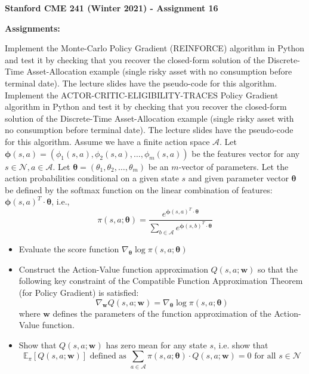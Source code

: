 \documentclass[12pt]{exam}
\begin{document}
\begin{center}
{\large {\bf Stanford CME 241 (Winter 2021) - Assignment 16}}
\end{center}
 
{\large{\bf Assignments:}}
\begin{questions}
\question Implement the Monte-Carlo Policy Gradient (REINFORCE) algorithm in Python and test it by checking that you recover the closed-form solution of the Discrete-Time Asset-Allocation example (single risky asset with no consumption before terminal date). The lecture slides have the pseudo-code for this algorithm.
\question Implement the ACTOR-CRITIC-ELIGIBILITY-TRACES Policy Gradient algorithm in Python and test it by checking that you recover the closed-form solution of the Discrete-Time Asset-Allocation example (single risky asset with no consumption before terminal date). The lecture slides have the pseudo-code for this algorithm.
\question Assume we have a finite action space $\mathcal{A}$. Let $\bm{\phi}(s,a) = (\phi_1(s,a), \phi_2(s,a), \ldots, \phi_m(s,a))$ be the features vector for any $s \in \mathcal{N}, a \in \mathcal{A}$. Let $\bm{\theta} = (\theta_1, \theta_2, \ldots, \theta_m)$ be an $m$-vector of parameters. Let the action probabilities conditional on a given state $s$ and given parameter vector $\bm{\theta}$ be defined by the softmax function on the linear combination of features: $\bm{\phi}(s,a)^T \cdot \bm{\theta}$, i.e.,
$$\pi(s, a ; \bm{\theta}) = \frac {e^{\bm{\phi}(s,a)^T \cdot \bm{\theta}}} {\sum_{b \in \mathcal{A}} e^{\bm{\phi}(s,b)^T \cdot \bm{\theta}}}$$
\begin{itemize}
\item Evaluate the score function $\nabla_{\bm{\theta}} \log \pi(s, a ; \bm{\theta})$
\item Construct the Action-Value function approximation $Q(s,a; \bm{w})$ so that the following key constraint of the Compatible Function Approximation Theorem (for Policy Gradient) is satisfied:
 $$\nabla_{\bm{w}} Q(s,a;\bm{w}) = \nabla_{\bm{\theta}} \log \pi(s, a ; \bm{\theta})$$
 where $\bm{w}$ defines the parameters of the function approximation of the Action-Value function.
 \item Show that $Q(s,a ; \bm{w})$ has zero mean for any state $s$, i.e. show that
 $$\mathbb{E}_{\pi} [Q(s,a; \bm{w})] \mbox{ defined as } \sum_{a \in \mathcal{A}} \pi(s, a ; \bm{\theta}) \cdot Q(s,a ; \bm{w}) = 0 \text{ for all } s \in \mathcal{N}$$
\end{itemize}

\end{questions}
\end{document}
